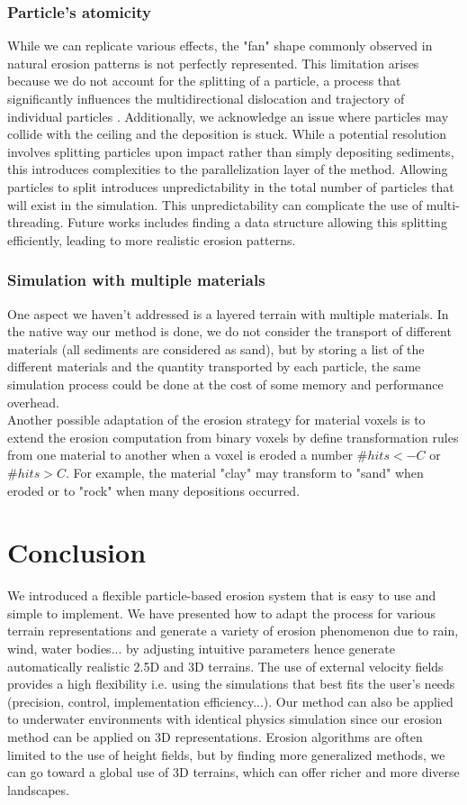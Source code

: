 \subsubsection{Particle's atomicity}
While we can replicate various effects, the "fan" shape commonly observed in natural erosion patterns is not perfectly represented. This limitation arises because we do not account for the splitting of a particle, a process that significantly influences the multidirectional dislocation and trajectory of individual particles \cite{Ranz1960}. Additionally, we acknowledge an issue where particles may collide with the ceiling and the deposition is stuck. While a potential resolution involves splitting particles upon impact rather than simply depositing sediments, this introduces complexities to the parallelization layer of the method. Allowing particles to split introduces unpredictability in the total number of particles that will exist in the simulation. This unpredictability can complicate the use of multi-threading. Future works includes finding a data structure allowing this splitting efficiently, leading to more realistic erosion patterns.

\subsubsection{Simulation with multiple materials}
One aspect we haven't addressed is a layered terrain with multiple materials. In the native way our method is done, we do not consider the transport of different materials (all sediments are considered as sand), but by storing a list of the different materials and the quantity transported by each particle, the same simulation process could be done at the cost of some memory and performance overhead. \\
Another possible adaptation of the erosion strategy for material voxels is to extend the erosion computation from binary voxels by define transformation rules from one material to another when a voxel is eroded a number $\#hits < -C$ or $\#hits > C$. For example, the material "clay" may transform to "sand" when eroded or to "rock" when many depositions occurred. 
\section{Conclusion}
\label{sec:erosion_conclusion}
We introduced a flexible particle-based erosion system that is easy to use and simple to implement. We have presented how to adapt the process for various terrain representations and generate a variety of erosion phenomenon due to rain, wind, water bodies... by adjusting intuitive parameters hence generate automatically realistic 2.5D and 3D terrains. The use of external velocity fields provides a high flexibility i.e. using the simulations that best fits the user's needs (precision, control, implementation efficiency...). 
Our method can also be applied to underwater environments with identical physics simulation since our erosion method can be applied on 3D representations. 
Erosion algorithms are often limited to the use of height fields, but by finding more generalized methods, we can go toward a global use of 3D terrains, which can offer richer and more diverse landscapes.

